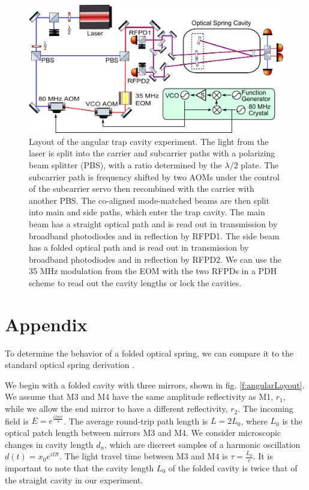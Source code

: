 \begin{figure}[p]
\begin{center}
\includegraphics[width=.9\textwidth]{figures/Angular/simplifiedLayout}
\end{center}
\caption[Angular trap experiment layout]{%
\label{f:experimentLayout}
Layout of the angular trap cavity experiment.
The light from the laser is split into the carrier and subcarrier paths with a polarizing beam splitter (PBS), with a ratio determined by the $\lambda/2$ plate.
The subcarrier path is frequency shifted by two AOMs under the control of the subcarrier servo then recombined with the carrier with another PBS. 
The co-aligned mode-matched beams are then split into main and side paths, which enter the trap cavity.
The main beam has a straight optical path and is read out in transmission by broadband photodiodes and in reflection by RFPD1.
The side beam has a folded optical path and is read out in transmission by broadband photodiodes and in reflection by RFPD2.
We can use the 35 MHz modulation from the EOM with the two RFPDs in a PDH scheme to read out the cavity
lengths or lock the cavities.
}
\end{figure}


\section{Appendix}
To determine the behavior of a folded optical spring, we can compare it to the standard optical spring derivation \cite{Perreca14}.

We begin with a folded cavity with three mirrors, shown in fig. \ref{f:angularLayout}. We assume that M3 and M4 have the same amplitude reflectivity as M1, $r_1$, while we allow the end mirror to have a different reflectivity, $r_2$. The incoming field is $E=e^{\frac{i 2 \pi c t}{\lambda}}$. The average round-trip path length is $L = 2L_0$, where $L_0$ is the optical patch length between mirrors M3 and M4. We consider microscopic changes in cavity length $d_n$, which are discreet samples of a harmonic oscillation $d(t) =  x_0 e^{i\Omega t}$. The light travel time between M3 and M4 is $\tau = \frac{L_0}{c}$. It is important to note that the cavity length $L_0$ of the folded cavity is twice that of the straight cavity in our experiment.

